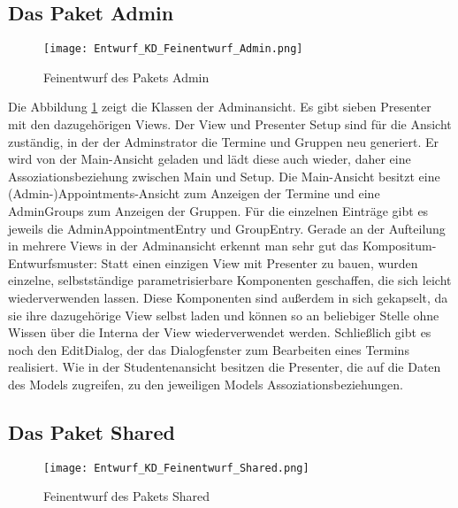  \subsection{Das Paket Admin}
 \begin{figure}
  \texttt{[image: Entwurf\_KD\_Feinentwurf\_Admin.png]}
  \label{fig:Klassendiagramm_Admin}
  \caption{Feinentwurf des Pakets Admin}
 \end{figure}

 Die Abbildung \ref{fig:Klassendiagramm_Admin} zeigt die Klassen der Adminansicht. Es gibt sieben Presenter mit den dazugehörigen Views.
 Der View und Presenter Setup sind für die Ansicht zuständig, in der der Adminstrator die Termine und Gruppen neu generiert. Er wird von der Main-Ansicht geladen und lädt diese auch wieder, daher eine Assoziationsbeziehung zwischen Main und Setup.
 Die Main-Ansicht besitzt eine (Admin-)Appointments-Ansicht zum Anzeigen der Termine und eine AdminGroups zum Anzeigen der Gruppen.
 Für die einzelnen Einträge gibt es jeweils die AdminAppointmentEntry und GroupEntry.
 Gerade an der Aufteilung in mehrere Views in der Adminansicht erkennt man sehr gut das Kompositum-Entwurfsmuster: Statt einen einzigen View mit Presenter zu bauen, wurden einzelne, selbstständige parametrisierbare Komponenten geschaffen, die sich leicht wiederverwenden lassen.
 Diese Komponenten sind außerdem in sich gekapselt, da sie ihre dazugehörige View selbst laden und können so an beliebiger Stelle ohne Wissen über die Interna der View wiederverwendet werden.
 Schließlich gibt es noch den EditDialog, der das Dialogfenster zum Bearbeiten eines Termins realisiert.
 Wie in der Studentenansicht besitzen die Presenter, die auf die Daten des Models zugreifen, zu den jeweiligen Models Assoziationsbeziehungen.

 \subsection{Das Paket Shared}
 \begin{figure}
  \texttt{[image: Entwurf\_KD\_Feinentwurf\_Shared.png]}
  \label{fig:Klassendiagramm_Shared}
  \caption{Feinentwurf des Pakets Shared}
 \end{figure}

